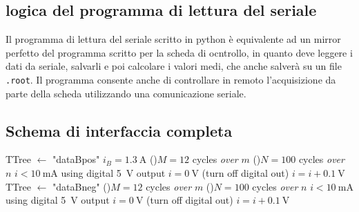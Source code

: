 \documentclass[fleqn,varvw,preprintnumbers,citeautoscript]{memo}
\begin{document}
\subsection{logica del programma di lettura del seriale}

Il programma di lettura del seriale scritto in python è equivalente ad un mirror perfetto del programma scritto per la scheda di ocntrollo, in quanto deve leggere i dati da seriale, salvarli e poi calcolare i valori medi, che anche salverà su un file \verb-.root-. Il programma consente anche di controllare in remoto l'acquisizione da parte della scheda utilizzando una comunicazione seriale. 

\subsection{Schema di interfaccia completa}

\begin{algorithm}
    \DontPrintSemicolon
    \CreateMode TTree $\gets$ "dataBpos"\;
    \SetMode $i_B=\SI{1.3}{\ampere}$\;
    \For(){$M=12$ cycles \emph{over} $m$}{
        \For(){$N=100$ cycles \emph{over} $n$}{
            \SetMode $i<\SI{10}{\milli\ampere}$ using digital \SI{5}{\volt} output\;
            \SetMode $i=\SI{0}{\volt}$ (turn off digital out)\;
            \Inc $i=i+\SI{0.1}{\volt}$
        }
    }
    \;
    \CreateMode TTree $\gets$ "dataBneg"\;
    \For(){$M=12$ cycles \emph{over} $m$}{
        \For(){$N=100$ cycles \emph{over} $n$}{
            \SetMode $i<\SI{10}{\milli\ampere}$ using digital \SI{5}{\volt} output\;
            \SetMode $i=\SI{0}{\volt}$ (turn off digital out)\;
            \Dec $i=i+\SI{0.1}{\volt}$
        }
    }
\end{algorithm}
\end{document}
